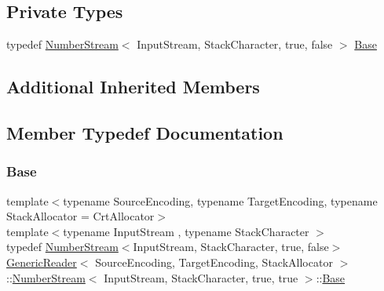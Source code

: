 \subsection*{Private Types}
\begin{DoxyCompactItemize}
\item 
typedef \hyperlink{classGenericReader_1_1NumberStream}{Number\+Stream}$<$ Input\+Stream, Stack\+Character, true, false $>$ \hyperlink{classGenericReader_1_1NumberStream_3_01InputStream_00_01StackCharacter_00_01true_00_01true_01_4_abe19b3955169c800e43adda897c9b83e}{Base}
\end{DoxyCompactItemize}
\subsection*{Additional Inherited Members}


\subsection{Member Typedef Documentation}
\mbox{\label{classGenericReader_1_1NumberStream_3_01InputStream_00_01StackCharacter_00_01true_00_01true_01_4_abe19b3955169c800e43adda897c9b83e}} 
\subsubsection{\texorpdfstring{Base}{Base}}
{\footnotesize\ttfamily template$<$typename Source\+Encoding, typename Target\+Encoding, typename Stack\+Allocator = Crt\+Allocator$>$ \\
template$<$typename Input\+Stream , typename Stack\+Character $>$ \\
typedef \hyperlink{classGenericReader_1_1NumberStream}{Number\+Stream}$<$Input\+Stream, Stack\+Character, true, false$>$ \hyperlink{classGenericReader}{Generic\+Reader}$<$ Source\+Encoding, Target\+Encoding, Stack\+Allocator $>$\+::\hyperlink{classGenericReader_1_1NumberStream}{Number\+Stream}$<$ Input\+Stream, Stack\+Character, true, true $>$\+::\hyperlink{classGenericReader_1_1NumberStream_3_01InputStream_00_01StackCharacter_00_01true_00_01false_01_4_a59fe7f9d3da6145a8ff45c6a9dad5de4}{Base}\hspace{0.3cm}{\ttfamily [private]}}



